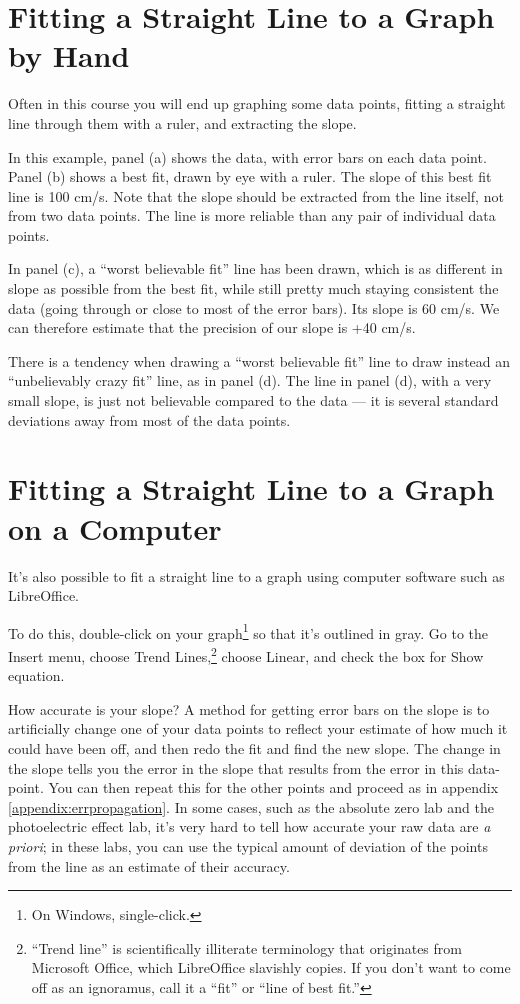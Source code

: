 \section{Fitting a Straight Line to a Graph by Hand}

Often in this course you will end up graphing some data
points, fitting a straight line through them with a ruler,
and extracting the slope.


In this example, panel (a) shows the data, with error bars
on each data point. Panel (b) shows a best fit, drawn by eye
with a ruler. The slope of this best fit line is 100 cm/s.
Note that the slope should be extracted from the line
itself, not from two data points. The line is more reliable
than any pair of individual data points.

In panel (c), a ``worst believable fit'' line has been
drawn, which is as different in slope as possible from the
best fit, while still pretty much staying consistent the
data (going through or close to most of the error bars). Its
slope is 60 cm/s. We can therefore estimate that the
precision of our slope is +40 cm/s.

There is a tendency when drawing a ``worst believable fit''
line to draw instead an ``unbelievably crazy fit'' line, as
in panel (d). The line in panel (d), with a very small
slope, is just not believable compared to the data --- it is
several standard deviations away from most of the data points.

\section{Fitting a Straight Line to a Graph on a Computer}
It's also possible to fit a straight line to a graph using computer
software such as LibreOffice. 

To do this, double-click on your graph\footnote{On Windows, single-click.} so that it's outlined in gray.
Go to the Insert menu, choose
Trend Lines,\footnote{``Trend line'' is scientifically illiterate terminology
that originates from Microsoft Office, which LibreOffice slavishly copies. If you
don't want to come off as an ignoramus, call it a ``fit'' or ``line of best fit.''
} choose Linear, and check the box for Show equation.

How accurate is your slope? A method for getting error bars on the slope
is to artificially change one of your data
points to reflect your estimate of how much it could have been off,
and then redo the fit and find the new slope. The change in the slope
tells you the error in the slope that results from the error in this
data-point. You can then repeat this for the other points and
proceed as in appendix \ref{appendix:errpropagation}. In some cases, such as the absolute zero
lab and the photoelectric effect lab, it's very hard to tell how accurate
your raw data are \emph{a priori}; in these labs, you can use the typical
amount of deviation of the points from the line as an estimate of their
accuracy.

